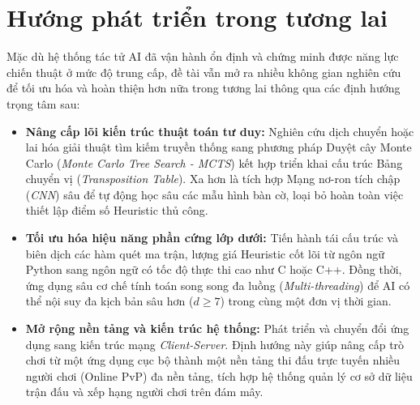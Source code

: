 \section{Hướng phát triển trong tương lai}

Mặc dù hệ thống tác tử AI đã vận hành ổn định và chứng minh được năng lực chiến thuật ở mức độ trung cấp, đề tài vẫn mở ra nhiều không gian nghiên cứu để tối ưu hóa và hoàn thiện hơn nữa trong tương lai thông qua các định hướng trọng tâm sau:

\begin{itemize}
	\item \textbf{Nâng cấp lõi kiến trúc thuật toán tư duy:} Nghiên cứu dịch chuyển hoặc lai hóa giải thuật tìm kiếm truyền thống sang phương pháp Duyệt cây Monte Carlo (\textit{Monte Carlo Tree Search - MCTS}) kết hợp triển khai cấu trúc Bảng chuyển vị (\textit{Transposition Table}). Xa hơn là tích hợp Mạng nơ-ron tích chập (\textit{CNN}) sâu để tự động học sâu các mẫu hình bàn cờ, loại bỏ hoàn toàn việc thiết lập điểm số Heuristic thủ công.
	
	\item \textbf{Tối ưu hóa hiệu năng phần cứng lớp dưới:} Tiến hành tái cấu trúc và biên dịch các hàm quét ma trận, lượng giá Heuristic cốt lõi từ ngôn ngữ Python sang ngôn ngữ có tốc độ thực thi cao như C hoặc C++. Đồng thời, ứng dụng sâu cơ chế tính toán song song đa luồng (\textit{Multi-threading}) để AI có thể nội suy đa kịch bản sâu hơn ($d \ge 7$) trong cùng một đơn vị thời gian.
	
	\item \textbf{Mở rộng nền tảng và kiến trúc hệ thống:} Phát triển và chuyển đổi ứng dụng sang kiến trúc mạng \textit{Client-Server}. Định hướng này giúp nâng cấp trò chơi từ một ứng dụng cục bộ thành một nền tảng thi đấu trực tuyến nhiều người chơi (Online PvP) đa nền tảng, tích hợp hệ thống quản lý cơ sở dữ liệu trận đấu và xếp hạng người chơi trên đám mây.
\end{itemize}